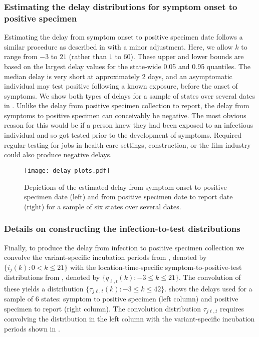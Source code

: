 \subsubsection{Estimating the delay distributions for symptom onset to positive specimen}
\label{supp:delay-sops}


Estimating the delay from symptom onset to positive specimen date follows a
similar procedure as described in  with a minor
adjustment. Here, we allow $k$ to range from $-3$ to $21$ (rather than $1$ to
$60$). These upper and lower bounds are based on the largest delay values for
the state-wide 0.05 and 0.95 quantiles. The median
delay is very short at approximately 2 days, and an asymptomatic individual may
test positive following a known exposure, before the onset of symptoms. We show
both types of delays for a sample of states over several dates in
. Unlike the delay from positive specimen collection
to report, the delay from symptoms to positive specimen can conceivably be
negative. The most obvious reason for this would be if a person knew they had been
exposed to an infectious individual and so got tested prior to the development
of symptoms. Required regular testing for jobs in health care settings,
construction, or the film industry could also produce negative delays.


\begin{figure}[t!]
\centering
    \texttt{[image: delay\_plots.pdf]} 
    \caption{Depictions of the estimated delay from symptom onset to
    positive specimen date (left) and from positive specimen date to report date
    (right) for a sample of six states over several dates.}
    \label{fig:delay-plots-samp}
\end{figure}

\subsubsection{Details on constructing the infection-to-test distributions}
\label{supp:details-conv}

Finally, to produce the delay from infection to positive specimen collection we
convolve the variant-specific incubation periods from ,
denoted by $\{i_{j}(k) : 0 < k \leq 21\}$ with the location-time-specific
symptom-to-positive-test distributions from , denoted by
$\{q_{\ell,t}(k) : -3\leq k \leq 21\}$. The convolution of these yields a
distribution $\{\tau_{j\ell,t}(k): -3 \leq k
\leq 42\}$.  shows the delays used for a sample of 6
states: symptom to positive specimen (left column) and positive specimen to report
(right column). The convolution distribution $\tau_{j\ell,t}$ requires
convolving the distribution in the left column with the variant-specific
incubation periods shown in .





